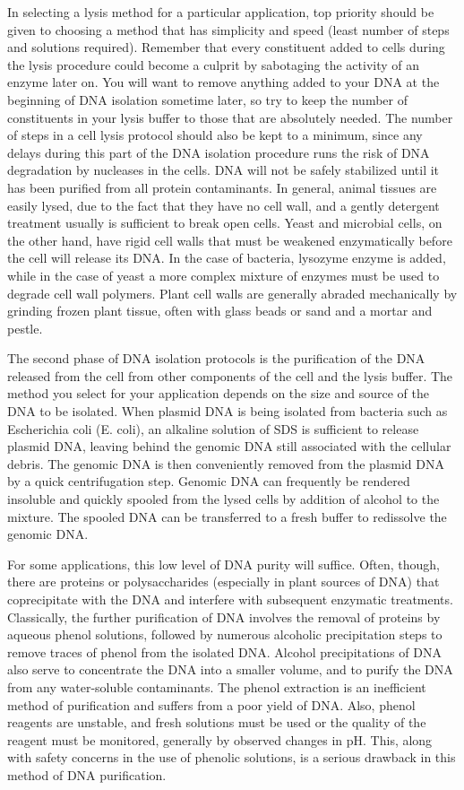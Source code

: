 \documentclass[11pt, oneside]{article}
\begin{document}
		In selecting a lysis method for a particular application, top priority should be given to choosing a method that has simplicity and speed (least 			number of steps and solutions required). Remember that every constituent added to cells during the lysis procedure could become a culprit by 			sabotaging the activity of an enzyme later on. You will want to remove anything added to your DNA at the beginning of DNA isolation sometime 		later, so try to keep the number of constituents in your lysis buffer to those that are absolutely needed. The number of steps in a cell lysis 				protocol should also be kept to a minimum, since any delays during this part of the DNA isolation procedure runs the risk of DNA degradation by 		nucleases in the cells. DNA will not be safely stabilized until it has been purified from all protein contaminants. In general, animal tissues are 			easily lysed, due to the fact that they have no cell wall, and a gently detergent treatment usually is sufficient to break open cells. Yeast and 			microbial cells, on the other hand, have rigid cell walls that must be weakened enzymatically before the cell will release its DNA. In the case of 			bacteria, lysozyme enzyme is added, while in the case of yeast a more complex mixture of enzymes must be used to degrade cell wall polymers. 		Plant cell walls are generally abraded mechanically by grinding frozen plant tissue, often with glass beads or sand and a mortar and pestle.

		The second phase of DNA isolation protocols is the purification of the DNA released from the cell from other components of the cell and the lysis 		buffer. The method you select for your application depends on the size and source of the DNA to be isolated. When plasmid DNA is being 			isolated from bacteria such as Escherichia coli (E. coli), an alkaline solution of SDS is sufficient to release plasmid DNA, leaving behind the 			genomic DNA still associated with the cellular debris. The genomic DNA is then conveniently removed from the plasmid DNA by a quick 				centrifugation step. Genomic DNA can frequently be rendered insoluble and quickly spooled from the lysed cells by addition of alcohol to the 			mixture. The spooled DNA can be transferred to a fresh buffer to redissolve the genomic DNA.

		For some applications, this low level of DNA purity will suffice. Often, though, there are proteins or polysaccharides (especially in plant sources of 		DNA) that coprecipitate with the DNA and interfere with subsequent enzymatic treatments. Classically, the further purification of DNA involves the 		removal of proteins by aqueous phenol solutions, followed by numerous alcoholic precipitation steps to remove traces of phenol from the isolated 		DNA. Alcohol precipitations of DNA also serve to concentrate the DNA into a smaller volume, and to purify the DNA from any water-soluble 			contaminants. The phenol extraction is an inefficient method of purification and suffers from a poor yield of DNA. Also, phenol reagents are 			unstable, and fresh solutions must be used or the quality of the reagent must be monitored, generally by observed changes in pH. This, along 			with safety concerns in the use of phenolic solutions, is a serious drawback in this method of DNA purification.
\end{document}
